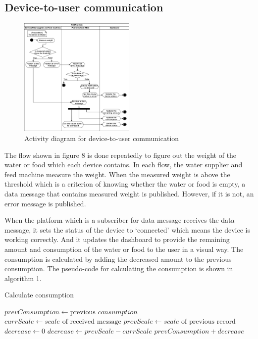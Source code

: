 \documentclass[conference]{IEEEtran}
\begin{document}
\subsection{Device-to-user communication}
\begin{figure}[htbp]
\centerline{\includegraphics[width=0.5\textwidth]{./images/device2user.png}}
\caption{Activity diagram for device-to-user communication}
\label{fig}
\end{figure}

The flow shown in figure 8 is done repeatedly to figure out the weight of the water or food which each device contains. In each flow, the water supplier and feed machine measure the weight. When the measured weight is above the threshold which is a criterion of knowing whether the water or food is empty, a data message that contains measured weight is published. However, if it is not, an error message is published. 

When the platform which is a subscriber for data message receives the data message, it sets the status of the device to ‘connected’ which means the device is working correctly. And it updates the dashboard to provide the remaining amount and consumption of the water or food to the user in a visual way. The consumption is calculated by adding the decreased amount to the previous consumption. The pseudo-code for calculating the consumption is shown in algorithm 1.

\begin{algorithm}
\caption{Calculate consumption}\label{algo}
\begin{algorithmic}[1]
        \State $prevConsumption \gets \text{previous } \textit{consumption}$
        \State $currScale \gets \textit{scale} \text{ of received message}$
        \State $prevScale \gets \textit{scale} \text{ of  previous record}$
        \State $decrease \gets 0$
            \State $decrease \gets prevScale - currScale$
        \EndIf
        \Return $prevConsumption + decrease$
    \EndProcedure
\end{algorithmic}
\end{algorithm}
\end{document}
